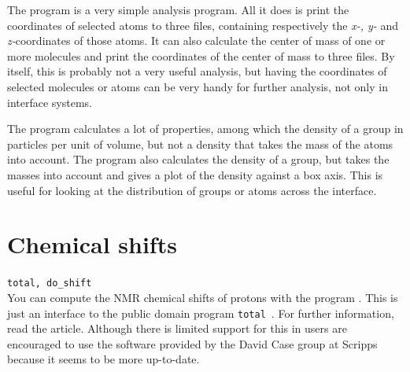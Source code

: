 {The program {\tt {}} is a very simple analysis program. All it
does is print the coordinates of selected atoms to three files,
containing respectively the {\em x-, y-} and {\em z-}coordinates of
those atoms. It can also calculate the center of mass of one or more
molecules and print the coordinates of the center of mass to three
files. By itself, this is probably not a very useful analysis, but
having the coordinates of selected molecules or atoms can be very
handy for further analysis, not only in interface systems.

The program {\tt {}} calculates a lot of properties, among which
the density of a group in particles per unit of volume, but not a
density that takes the mass of the atoms into account. The program
{\tt {}} also calculates the density of a group, but takes the
masses into account and gives a plot of the density against a box
axis. This is useful for looking at the distribution of groups or
atoms across the interface.


\section{Chemical shifts}
{\tt total, do\_shift}\\
You can compute the NMR chemical shifts of protons with the program
{\tt {}}. This is just an {\gromacs} interface to
the public domain program {\tt total}~\cite{Williamson93a}. For
further information, read the article. Although there is limited
support for this in {\gromacs} users are encouraged to use the
software provided by the David Case group at Scripps because it seems
to be more up-to-date.

} %
